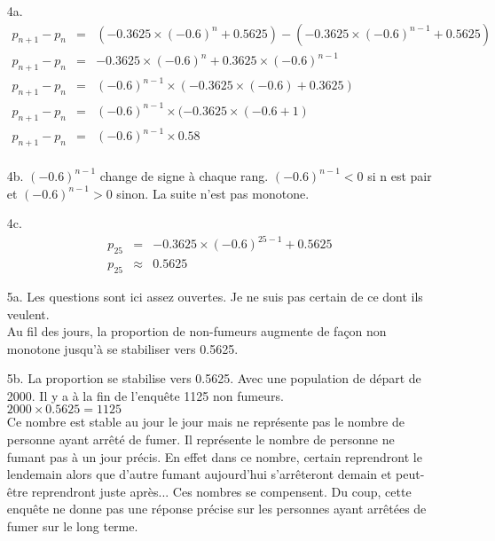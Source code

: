 \documentclass[11pt]{article}
\begin{document}
\begin{enumerate}

\item[4a.] 
  \begin{eqnarray*}
    p_{n+1} - p_n &=& ( -0.3625 \times (-0.6)^{n} + 0.5625) - ( -0.3625 \times (-0.6)^{n-1} + 0.5625) \\
    p_{n+1} - p_n &=& -0.3625 \times (-0.6)^{n} + 0.3625 \times (-0.6)^{n-1} \\
    p_{n+1} - p_n &=& (-0.6)^{n-1} \times (-0.3625 \times (-0.6) + 0.3625 ) \\
    p_{n+1} - p_n &=& (-0.6)^{n-1} \times (-0.3625 \times (-0.6 + 1) \\
    p_{n+1} - p_n &=& (-0.6)^{n-1} \times 0.58 \\ 
  \end{eqnarray*}
  
\item[4b.] $(-0.6)^{n-1}$ change de signe à chaque rang. $(-0.6)^{n-1} < 0$ si n est pair et $(-0.6)^{n-1} > 0$ sinon.
  La suite n'est pas monotone.
  
\item[4c.]
  \begin{eqnarray*}
    p_{25} &=& -0.3625 \times (-0.6)^{25-1} + 0.5625 \\
    p_{25} &\approx& 0.5625
  \end{eqnarray*}
  
\item[5a.] Les questions sont ici assez ouvertes. Je ne suis pas certain de ce dont ils veulent. \\
  
  Au fil des jours, la proportion de non-fumeurs augmente de façon non monotone jusqu'à se stabiliser vers 0.5625. 
  
\item[5b.] La proportion se stabilise vers 0.5625. Avec une population de départ de 2000. Il y a à la fin de l'enquête 1125 non fumeurs. \\
  $2000 \times 0.5625 = 1125$ \\
  Ce nombre est stable au jour le jour mais ne représente pas le nombre de personne ayant arrêté de fumer. Il représente le nombre de personne ne fumant pas à un jour précis. En effet dans ce nombre, certain reprendront le lendemain alors que d'autre fumant aujourd'hui s’arrêteront demain et peut-être reprendront juste après... Ces nombres se compensent. Du coup, cette enquête ne donne pas une réponse précise sur les personnes ayant arrêtées de fumer sur le long terme. 
\end{enumerate}
\end{document}
